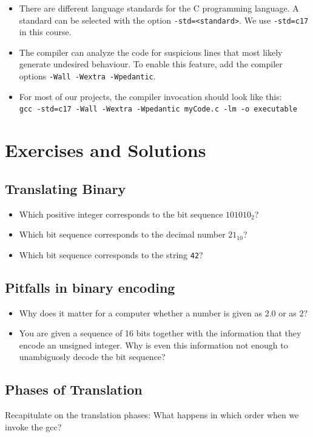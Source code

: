 \begin{defbox}[]
\begin{itemize}
\item There are different language standards for the C programming language. A standard can be selected with the option \texttt{-std=<standard>}. We use \texttt{-std=c17} in this course.
\item The compiler can analyze the code for suspicious lines that most likely generate undesired behaviour. To enable this feature, add the compiler options \texttt{-Wall -Wextra -Wpedantic}.
\item For most of our projects, the compiler invocation should look like this:\\
	\texttt{gcc -std=c17 -Wall -Wextra -Wpedantic myCode.c -lm -o executable}
\end{itemize}
\end{defbox}

\newpage
\section{Exercises and Solutions}
\subsection*{Translating Binary}
\begin{itemize}
\item Which positive integer corresponds to the bit sequence $101010_2$?
\item Which bit sequence corresponds to the decimal number $21_{10}$?
\item Which bit sequence corresponds to the string \texttt{42}?
\end{itemize}

\subsection*{Pitfalls in binary encoding}
\begin{itemize}
\item Why does it matter for a computer whether a number is given as $2.0$ or as $2$?
\item You are given a sequence of 16 bits together with the information that they encode an unsigned integer. Why is even this information not enough to unambiguosly decode the bit sequence?
\end{itemize}

\subsection*{Phases of Translation}
Recapitulate on the translation phases: What happens in which order when we invoke the gcc?

